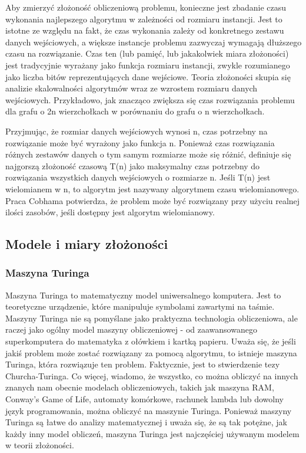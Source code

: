 Aby zmierzyć złożoność obliczeniową problemu, konieczne jest zbadanie czasu wykonania najlepszego algorytmu w zależności od rozmiaru instancji. Jest to istotne ze względu na fakt, że czas wykonania zależy od konkretnego zestawu danych wejściowych, a większe instancje problemu zazwyczaj wymagają dłuższego czasu na rozwiązanie. Czas ten (lub pamięć, lub jakakolwiek miara złożoności) jest tradycyjnie wyrażany jako funkcja rozmiaru instancji, zwykle rozumianego jako liczba bitów reprezentujących dane wejściowe. Teoria złożoności skupia się analizie skalowalności algorytmów wraz ze wzrostem rozmiaru danych wejściowych. Przykładowo, jak znacząco zwiększa się czas rozwiązania problemu dla grafu o 2n wierzchołkach w porównaniu do grafu o n wierzchołkach.

Przyjmując, że rozmiar danych wejściowych wynosi n, czas potrzebny na rozwiązanie może być wyrażony jako funkcja n.  Ponieważ czas rozwiązania różnych zestawów danych o tym samym rozmiarze może się różnić, definiuje się najgorszą złożoność czasową T(n) jako maksymalny czas potrzebny do rozwiązania wszystkich danych wejściowych o rozmiarze n.  Jeśli T(n) jest wielomianem w n, to algorytm jest nazywany algorytmem czasu wielomianowego. Praca Cobhama potwierdza, że problem może być rozwiązany przy użyciu realnej ilości zasobów, jeśli dostępny jest algorytm wielomianowy.

	\subsection{Modele i miary złożoności}
	
	\subsubsection{Maszyna Turinga}
Maszyna Turinga to matematyczny model uniwersalnego komputera. Jest to teoretyczne urządzenie, które manipuluje symbolami zawartymi na taśmie. Maszyny Turinga nie są pomyślane jako praktyczna technologia obliczeniowa, ale raczej jako ogólny model maszyny obliczeniowej - od zaawansowanego superkomputera do matematyka z ołówkiem i kartką papieru. Uważa się, że jeśli jakiś problem może zostać rozwiązany za pomocą algorytmu, to istnieje maszyna Turinga, która rozwiązuje ten problem. Faktycznie, jest to stwierdzenie tezy Churcha-Turinga. Co więcej, wiadomo, że wszystko, co można obliczyć na innych znanych nam obecnie modelach obliczeniowych, takich jak maszyna RAM, Conway's Game of Life, automaty komórkowe, rachunek lambda lub dowolny język programowania, można obliczyć na maszynie Turinga. Ponieważ maszyny Turinga są łatwe do analizy matematycznej i uważa się, że są tak potężne, jak każdy inny model obliczeń, maszyna Turinga jest najczęściej używanym modelem w teorii złożoności.

